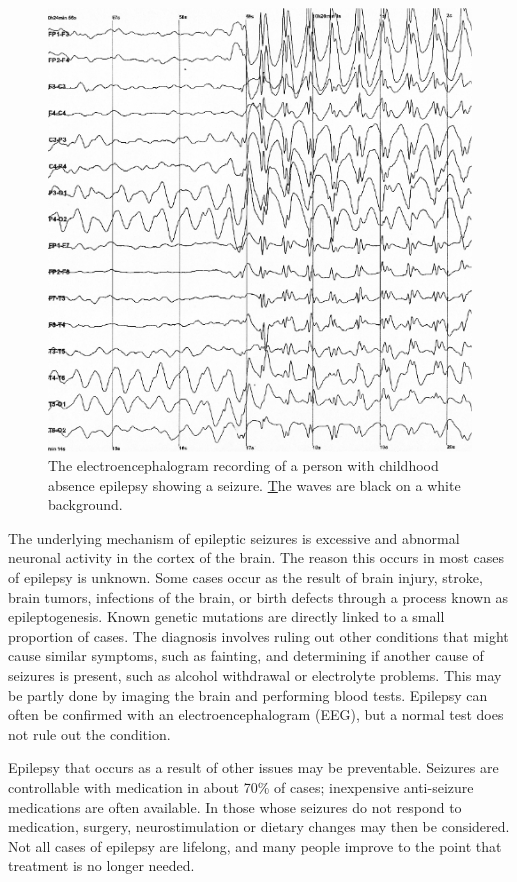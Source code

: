 \begin{figure}

{\centering \includegraphics[width=0.7\linewidth]{./figures/disease/Spike-waves} 

}

\caption{The electroencephalogram recording of a person with childhood absence epilepsy showing a seizure. \href{https://commons.wikimedia.org/wiki/File:Spike-waves.png} The waves are black on a white background.}\label{fig:epilepsyeeg}

\end{figure}

The underlying mechanism of epileptic seizures is excessive and abnormal
neuronal activity in the cortex of the brain. The reason this occurs in
most cases of epilepsy is unknown. Some cases occur as the result of
brain injury, stroke, brain tumors, infections of the brain, or birth
defects through a process known as epileptogenesis. Known genetic
mutations are directly linked to a small proportion of cases. The
diagnosis involves ruling out other conditions that might cause similar
symptoms, such as fainting, and determining if another cause of seizures
is present, such as alcohol withdrawal or electrolyte problems. This may
be partly done by imaging the brain and performing blood tests. Epilepsy
can often be confirmed with an electroencephalogram (EEG), but a normal
test does not rule out the condition.

Epilepsy that occurs as a result of other issues may be preventable.
Seizures are controllable with medication in about 70\% of cases;
inexpensive anti-seizure medications are often available. In those whose
seizures do not respond to medication, surgery, neurostimulation or
dietary changes may then be considered. Not all cases of epilepsy are
lifelong, and many people improve to the point that treatment is no
longer needed.

